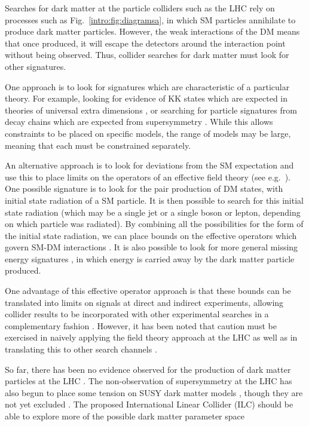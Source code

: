 Searches for dark matter at the particle colliders such as the LHC rely on processes such as Fig.~\ref{intro:fig:diagramsa}, in which SM particles annihilate to produce dark matter particles. However, the weak interactions of the DM means that once produced, it will escape the detectors around the interaction point without being observed. Thus, collider searches for dark matter must look for other signatures.

One approach is to look for signatures which are characteristic of a particular theory. For example, looking for evidence of KK states which are expected in theories of universal extra dimensions \cite{Edelhauser:2013, Kakuda:2013}, or searching for particle signatures from decay chains which are expected from supersymmetry \cite{ATLAS:2013, CMS:2013}. While this allows constraints to be placed on specific models, the range of models may be large, meaning that each must be constrained separately.


An alternative approach is to look for deviations from the SM expectation and use this to place limits on the operators of an effective field theory (see e.g.~\cite{Zhang:2011}). One possible signature is to look for the pair production of DM states, with initial state radiation of a SM particle. It is then possible to search for this initial state radiation (which may be a single jet or a single boson or lepton, depending on which particle was radiated). By combining all the possibilities for the form of the initial state radiation, we can place bounds on the effective operators which govern SM-DM interactions \cite{Zhou:2013}.  It is also possible to look for more general missing energy signatures \cite{Fox:2011a}, in which energy is carried away by the dark matter particle produced.

One advantage of this effective operator approach is that these bounds can be translated into limits on signals at direct and indirect experiments, allowing collider results to be incorporated with other experimental searches in a complementary fashion \cite{Baer:2009}. However, it has been noted that caution must be exercised in naively applying the field theory approach at the LHC as well as in translating this to other search channels \cite{Buchmueller:2013,Busoni:2013}.

So far, there has been no evidence observed for the production of dark matter particles at the LHC \cite{}. The non-observation of supersymmetry at the LHC has also begun to place some tension on SUSY dark matter models \cite{Bechtle:2012}, though they are not yet excluded \cite{Bechtle:2013}. The proposed International Linear Collider (ILC) \cite{Barish:2013} should be able to explore more of the possible dark matter parameter space \cite{Schmeier:2013,Chae:2013}


